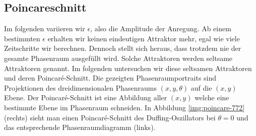 \documentclass[11,5pt, twoside]{article}
\begin{document}
\subsection{ Poincareschnitt }
Im folgenden variieren wir $\epsilon$, also die Amplitude der Anregung.
Ab einem bestimmten $\epsilon$ erhalten wir keinen eindeutigen Attraktor mehr, egal wie viele Zeitschritte wir berechnen. Dennoch stellt sich heraus, dass trotzdem nie der gesamte Phasenraum ausgefüllt wird. Solche Attraktoren werden seltsame Attraktoren genannt. Im folgenden untersuchen wir diese seltsamen Attraktoren und deren Poincaré-Schnitt. 
Die gezeigten Phasenraumportraits sind Projektionen des dreidimensionalen Phasenraums $(x,y,\theta)$ auf die $(x,y)$ Ebene. Der Poincaré-Schnitt ist eine Abbildung aller $(x,y)$ welche eine bestimmte Ebene im Phasenraum schneiden. In Abbildung \ref{img:poincare-772} (rechts) sieht man einen Poincaré-Schnitt des Duffing-Oszillators bei $\theta=0$ und das entsprechende Phasenraumdiagramm (links).
\end{document}
